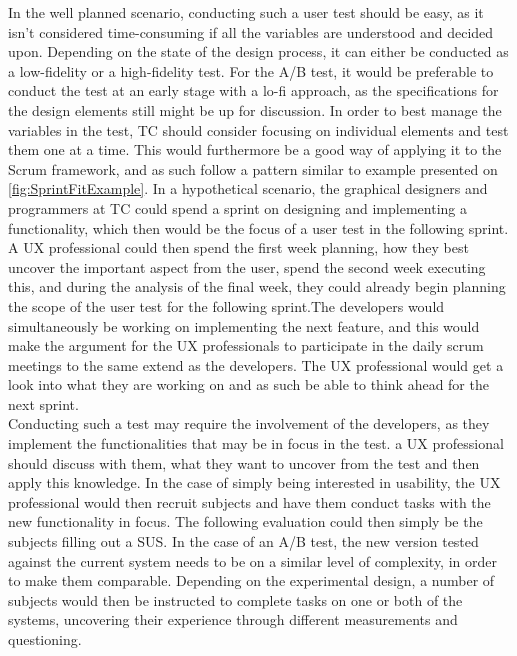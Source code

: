 \noindent
In the well planned scenario, conducting such a user test should be easy, as it isn't considered time-consuming if all the variables are understood and decided upon. Depending on the state of the design process, it can either be conducted as a low-fidelity or a high-fidelity test. For the A/B test, it would be preferable to conduct the test at an early stage with a lo-fi approach, as the specifications for the design elements still might be up for discussion. In order to best manage the variables in the test, TC should consider focusing on individual elements and test them one at a time. This would furthermore be a good way of applying it to the Scrum framework, and as such follow a pattern similar to example presented on \autoref{fig:SprintFitExample}. In a hypothetical scenario, the graphical designers and programmers at TC could spend a sprint on designing and implementing a functionality, which then would be the focus of a user test in the following sprint. A UX professional could then spend the first week planning, how they best uncover the important aspect from the user, spend the second week executing this, and during the analysis of the final week, they could already begin planning the scope of the user test for the following sprint.The developers would simultaneously be working on implementing the next feature, and this would make the argument for the UX professionals to participate in the daily scrum meetings to the same extend as the developers. The UX professional would get a look into what they are working on and as such be able to think ahead for the next sprint.\\

\noindent
Conducting such a test may require the involvement of the developers, as they implement the functionalities that may be in focus in the test. a UX professional should discuss with them, what they want to uncover from the test and then apply this knowledge. In the case of simply being interested in usability, the UX professional would then recruit subjects and have them conduct tasks with the new functionality in focus. The following evaluation could then simply be the subjects filling out a SUS. In the case of an A/B test, the new version tested against the current system needs to be on a similar level of complexity, in order to make them comparable. Depending on the experimental design, a number of subjects would then be instructed to complete tasks on one or both of the systems, uncovering their experience through different measurements and questioning.

